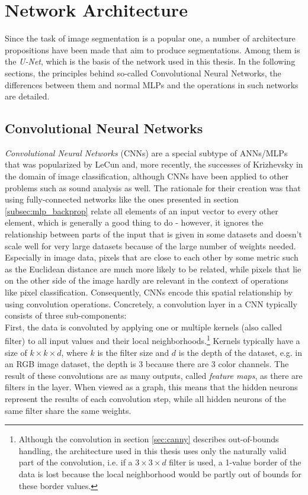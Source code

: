 \chapter {Network Architecture}

Since the task of image segmentation is a popular one, a number of architecture propositions have been made that aim to produce segmentations. Among them is the \textit{U-Net}, which is the basis of the network used in this thesis.  In the following sections, the principles behind so-called Convolutional Neural Networks, the differences between them and normal MLPs and the operations in such networks are detailed.


	\section{Convolutional Neural Networks}
\label{sec:CNN}
\textit{Convolutional Neural Networks} (CNNs) are a special subtype of ANNs/MLPs that was popularized by LeCun \cite{lecun98} and, more recently, the successes of Krizhevsky \cite{krizhevsky2012} in the domain of image classification, although CNNs have been applied to other problems such as sound analysis as well. The rationale for their creation was that using fully-connected networks like the ones presented in section \ref{subsec:mlp_backprop} relate all elements of an input vector to every other element, which is generally a good thing to do - however, it ignores the relationship between parts of the input that is given in some datasets and doesn't scale well for very large datasets because of the large number of weights needed. Especially in image data, pixels that are close to each other by some metric such as the Euclidean distance are much more likely to be related, while pixels that lie on the other side of the image hardly are relevant in the context of operations like pixel classification. Consequently, CNNs encode this spatial relationship by using convolution operations. Concretely, a convolution layer in a CNN typically consists of three sub-components:\\

\noindent First, the data is convoluted by applying one or multiple kernels (also called filter) to all input values and their local neighborhoods.\footnote{Although the convolution in section \ref{sec:canny} describes out-of-bounds handling, the architecture used in this thesis uses only the naturally valid part of the convolution, i.e. if a $3 \times 3 \times d$ filter is used, a 1-value border of the data is lost because the local neighborhood would be partly out of bounds for these border values.} Kernels typically have a size of $k \times k \times d$, where $k$ is the filter size and $d$ is the depth of the dataset, e.g. in an RGB image dataset, the depth is 3 because there are 3 color channels. The result of these convolutions are as many outputs, called \textit{feature maps}, as there are filters in the layer. When viewed as a graph, this means that the hidden neurons represent the results of each convolution step, while all hidden neurons of the same filter share the same weights.


